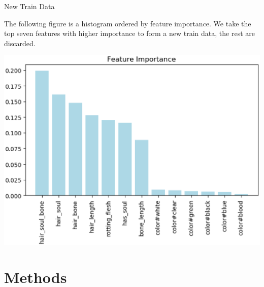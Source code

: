 \documentclass[
size=14pt,
paper=smartboard,  %
mode=present, 		%
display=slides, 	%
pauseslide,
fleqn,leqno]{powerdot}
\begin{document}

\begin{slide}[toc=,bm=]{New Train Data}
	
	The following figure is 
	a histogram ordered by 
	feature importance. 
	We take the top seven features 
	with higher importance 
	to form a new train data, 
	the rest are discarded.
	\begin{center}
		\includegraphics[scale=0.5]{figures/FEATURE.eps}
	\end{center}
	
\end{slide}


\section{Methods}
\end{document}
